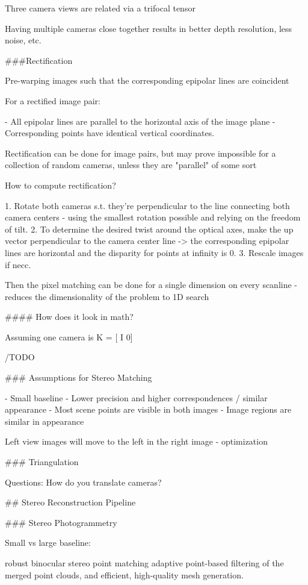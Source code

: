 Three camera views are related via a trifocal tensor 

Having multiple cameras close together results in better depth resolution, less noise, etc.

###Rectification

Pre-warping images such that the corresponding epipolar lines are coincident

For a rectified image pair:

- All epipolar lines are parallel to the horizontal axis of the image plane
- Corresponding points have identical vertical coordinates.

Rectification can be done for image pairs, but may prove impossible for a collection of random cameras, unless they are "parallel" of some sort

How to compute rectification?

1. Rotate both cameras s.t. they're perpendicular to the line connecting both camera centers - using the smallest rotation possible and relying on the freedom of tilt. 
2. To determine the desired twist around the optical axes, make the up vector perpendicular to the camera center line -> the corresponding epipolar lines are horizontal and the disparity for points at infinity is 0. 
3. Rescale images if necc.

Then the pixel matching can be done for a single dimension on every scanline - reduces the dimensionality of the problem to 1D search

#### How does it look in math?

Assuming one camera is K = [ I 0]

/TODO

### Assumptions for Stereo Matching

- Small baseline
  - Lower precision and higher correspondences  / similar appearance
- Most scene points are visible in both images
- Image regions are similar in appearance

Left view images will move to the left in the right image - optimization

### Triangulation

Questions: How do you translate cameras?


## Stereo Reconstruction Pipeline

### Stereo Photogrammetry

Small vs large baseline:

robust binocular stereo
point matching
adaptive point-based filtering of the
merged point clouds, and efficient, high-quality mesh generation.

